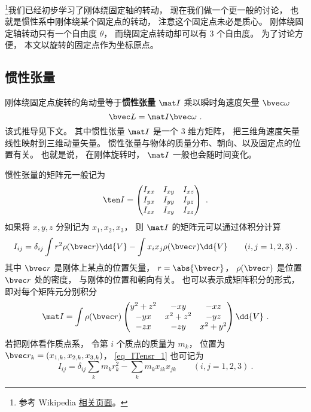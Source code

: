 
\begin{issues}
\issueTODO
\end{issues}


\footnote{参考 Wikipedia \href{https://en.wikipedia.org/wiki/Moment_of_inertia}{相关页面}。}我们已经初步学习了刚体绕固定轴的转动， 现在我们做一个更一般的讨论， 也就是惯性系中刚体绕某个固定点的转动， 注意这个固定点未必是质心。 刚体绕固定轴转动只有一个自由度 $\theta$， 而绕固定点转动却可以有 3 个自由度。 为了讨论方便， 本文以旋转的固定点作为坐标原点。

\subsection{惯性张量}
刚体绕固定点旋转的角动量等于\textbf{惯性张量} $\mat I$ 乘以瞬时角速度矢量 $\bvec \omega$
\begin{equation}\label{eq_ITensr_3}
\bvec L = \mat I \bvec \omega~.
\end{equation}
该式推导见下文。 其中惯性张量 $\mat I$ 是一个 3 维方矩阵， 把三维角速度矢量线性映射到三维动量矢量。 惯性张量与物体的质量分布、朝向、以及固定点的位置有关。 也就是说， 在刚体旋转时， $\mat I$ 一般也会随时间变化。

惯性张量的矩阵元一般记为
\begin{equation}
\ten I = \begin{pmatrix}
I_{xx}& I_{xy}& I_{xz} \\
I_{yx}& I_{yy}& I_{yz} \\
I_{zx}& I_{zy}& I_{zz}
\end{pmatrix}~.
\end{equation}
如果将 $x, y, z$ 分别记为 $x_1, x_2, x_3$， 则 $\mat I$ 的矩阵元可以通过体积分计算
\begin{equation}\label{eq_ITensr_1}
I_{ij} = \delta_{ij} \int r^2 \rho(\bvec r)\dd{V} - \int x_i x_j \rho(\bvec r)\dd{V} \qquad (i, j = 1, 2, 3)~.
\end{equation}
其中 $\bvec r$ 是刚体上某点的位置矢量， $r = \abs{\bvec r}$， $\rho(\bvec r)$ 是位置 $\bvec r$ 处的密度， 与刚体的位置和朝向有关。 也可以表示成矩阵积分的形式， 即对每个矩阵元分别积分
\begin{equation}\label{eq_ITensr_2}
\mat I = \int \rho(\bvec r)
\begin{pmatrix}
y^2 + z^2 & -xy & -xz\\
-yx & x^2 + z^2 & -yz\\
-zx & -zy & x^2 + y^2
\end{pmatrix}
\dd{V}~.
\end{equation}
若把刚体看作质点系， 令第 $i$ 个质点的质量为 $m_k$， 位置为 $\bvec r_{k} = (x_{1,k},x_{2,k},x_{3,k})$， \autoref{eq_ITensr_1} 也可记为
\begin{equation}\label{eq_ITensr_8}
I_{ij} = \delta_{ij}\sum_k m_k r_k^2 - \sum_k m_k x_{ik}x_{jk} \qquad (i, j = 1, 2, 3)~.
\end{equation}

